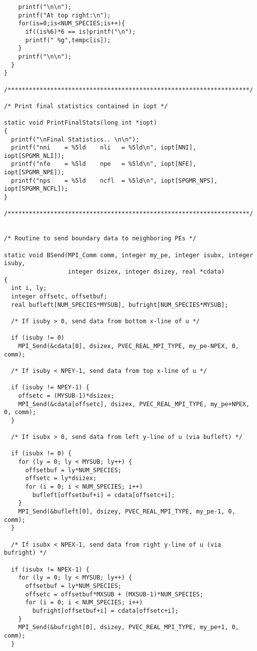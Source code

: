 \documentclass[11pt]{article}
\begin{document}
\begin{verbatim}
    printf("\n\n");
    printf("At top right:\n");
    for(is=0;is<NUM_SPECIES;is++){
      if((is%6)*6 == is)printf("\n");
      printf(" %g",tempc[is]);
    }
    printf("\n\n");
  }
}

/********************************************************************/

/* Print final statistics contained in iopt */

static void PrintFinalStats(long int *iopt)
{
  printf("\nFinal Statistics.. \n\n");
  printf("nni    = %5ld    nli   = %5ld\n", iopt[NNI], iopt[SPGMR_NLI]);
  printf("nfe    = %5ld    npe   = %5ld\n", iopt[NFE], iopt[SPGMR_NPE]);
  printf("nps    = %5ld    ncfl  = %5ld\n", iopt[SPGMR_NPS], iopt[SPGMR_NCFL]);
}

/********************************************************************/


/* Routine to send boundary data to neighboring PEs */

static void BSend(MPI_Comm comm, integer my_pe, integer isubx, integer isuby,
                  integer dsizex, integer dsizey, real *cdata)
{
  int i, ly;
  integer offsetc, offsetbuf;
  real bufleft[NUM_SPECIES*MYSUB], bufright[NUM_SPECIES*MYSUB];

  /* If isuby > 0, send data from bottom x-line of u */

  if (isuby != 0)
    MPI_Send(&cdata[0], dsizex, PVEC_REAL_MPI_TYPE, my_pe-NPEX, 0, comm);

  /* If isuby < NPEY-1, send data from top x-line of u */

  if (isuby != NPEY-1) {
    offsetc = (MYSUB-1)*dsizex;
    MPI_Send(&cdata[offsetc], dsizex, PVEC_REAL_MPI_TYPE, my_pe+NPEX, 0, comm);
  }

  /* If isubx > 0, send data from left y-line of u (via bufleft) */

  if (isubx != 0) {
    for (ly = 0; ly < MYSUB; ly++) {
      offsetbuf = ly*NUM_SPECIES;
      offsetc = ly*dsizex;
      for (i = 0; i < NUM_SPECIES; i++)
        bufleft[offsetbuf+i] = cdata[offsetc+i];
    }
    MPI_Send(&bufleft[0], dsizey, PVEC_REAL_MPI_TYPE, my_pe-1, 0, comm);   
  }

  /* If isubx < NPEX-1, send data from right y-line of u (via bufright) */

  if (isubx != NPEX-1) {
    for (ly = 0; ly < MYSUB; ly++) {
      offsetbuf = ly*NUM_SPECIES;
      offsetc = offsetbuf*MXSUB + (MXSUB-1)*NUM_SPECIES;
      for (i = 0; i < NUM_SPECIES; i++)
        bufright[offsetbuf+i] = cdata[offsetc+i];
    }
    MPI_Send(&bufright[0], dsizey, PVEC_REAL_MPI_TYPE, my_pe+1, 0, comm);   
  }


\end{verbatim}
\end{document}
